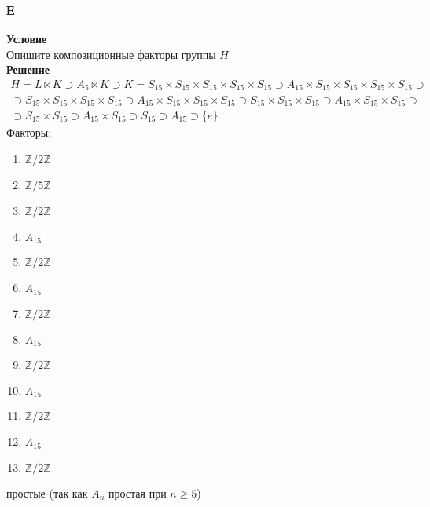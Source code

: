 			\subsubsection*{\textbf{Е}}
			\textbf{Условие}\\
			Опишите композиционные факторы группы $H$
			\\
			\textbf{Решение}\\
			\begin{gather*}
				H = L \ltimes K \supset A_{5} \ltimes K \supset K = S_{15} \times S_{15} \times S_{15} \times S_{15} \times S_{15} \supset A_{15} \times S_{15}  \times S_{15}  \times S_{15}  \times S_{15} \supset\\
				\supset S_{15} \times S_{15}  \times S_{15}  \times S_{15} \supset A_{15} \times S_{15}  \times S_{15}  \times S_{15} \supset S_{15} \times S_{15}  \times S_{15} \supset A_{15} \times S_{15}  \times S_{15} \supset\\
				\supset S_{15} \times S_{15} \supset A_{15} \times S_{15} \supset S_{15} \supset A_{15} \supset \{e\}
			\end{gather*}
			Факторы:
			\begin{enumerate}
				\item $\mathbb{Z}\slash 2\mathbb{Z}$
				\item $\mathbb{Z}\slash 5\mathbb{Z}$
				\item $\mathbb{Z}\slash 2\mathbb{Z}$
				\item $A_{15}$
				\item $\mathbb{Z}\slash 2\mathbb{Z}$
				\item $A_{15}$
				\item $\mathbb{Z}\slash 2\mathbb{Z}$
				\item $A_{15}$
				\item $\mathbb{Z}\slash 2\mathbb{Z}$
				\item $A_{15}$
				\item $\mathbb{Z}\slash 2\mathbb{Z}$
				\item $A_{15}$
				\item $\mathbb{Z}\slash 2\mathbb{Z}$
			\end{enumerate}
		простые (так как $A_n$ простая при $n \geqslant 5$) 